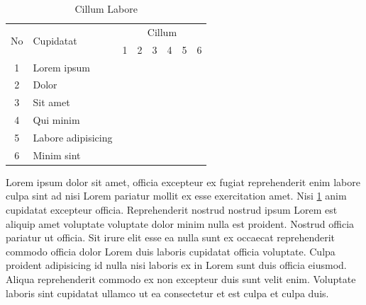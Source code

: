 \begin{table}[H]
	\centering
	\caption{Cillum Labore}
	\label{tab:cillumlabore}
	\begin{tabular}{|c|l|l|l|l|l|l|l|}
		\hline
		\multirow{2}{*}{No} & \multirow{2}{*}{Cupidatat} & \multicolumn{6}{c|}{Cillum}                                                                                                \\ \cline{3-8}
		                    &                            & 1                           & 2                & 3                & 4                & 5                & 6                \\ \hline
		1                   & Lorem ipsum                & \cellcolor{gray}            & \cellcolor{gray} &                  &                  &                  &                  \\ \hline
		2                   & Dolor                      &                             & \cellcolor{gray} & \cellcolor{gray} &                  &                  &                  \\ \hline
		3                   & Sit amet                   &                             &                  & \cellcolor{gray} &                  &                  &                  \\ \hline
		4                   & Qui minim                  &                             &                  & \cellcolor{gray} & \cellcolor{gray} & \cellcolor{gray} &                  \\ \hline
		5                   & Labore adipisicing         &                             &                  &                  & \cellcolor{gray} & \cellcolor{gray} &                  \\ \hline
		6                   & Minim sint                 &                             &                  &                  &                  &                  & \cellcolor{gray} \\ \hline
	\end{tabular}
\end{table}

Lorem ipsum dolor sit amet, officia excepteur ex fugiat reprehenderit enim labore culpa sint ad nisi Lorem pariatur mollit ex esse exercitation amet. Nisi \ref{tab:cillumlabore} anim cupidatat excepteur officia. Reprehenderit nostrud nostrud ipsum Lorem est aliquip amet voluptate voluptate dolor minim nulla est proident. Nostrud officia pariatur ut officia. Sit irure elit esse ea nulla sunt ex occaecat reprehenderit commodo officia dolor Lorem duis laboris cupidatat officia voluptate. Culpa proident adipisicing id nulla nisi laboris ex in Lorem sunt duis officia eiusmod. Aliqua reprehenderit commodo ex non excepteur duis sunt velit enim. Voluptate laboris sint cupidatat ullamco ut ea consectetur et est culpa et culpa duis.

